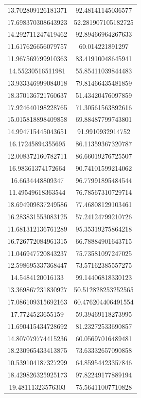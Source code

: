 \begin{table}
\begin{tabular}{cc}
13.702809126181371 & 92.48141145036577 \\
17.698370308643923 & 52.281907105182725 \\
14.292711247419462 & 92.89466964267633 \\
11.617626656079757 & 60.014221891297 \\
11.967569799910363 & 83.41910048645941 \\
14.55230516511981 & 55.85411039844483 \\
13.933346999084018 & 79.81466435481859 \\
18.370136721760637 & 51.43420476097859 \\
17.924640198228765 & 71.30561563892616 \\
15.015818898409858 & 69.88487799743801 \\
14.994715445043651 & 91.9910932914752 \\
16.17245894355695 & 86.11359367320787 \\
12.008372160782711 & 86.66019276725507 \\
16.98361374172664 & 90.74101599214062 \\
16.6634448809347 & 96.77991895484544 \\
11.49549618363544 & 76.78567310729714 \\
18.694909837249586 & 77.46808129103461 \\
16.283831553083125 & 57.24124799210726 \\
11.681312136761289 & 95.35319275864218 \\
16.726772084961315 & 66.78884901643715 \\
11.046947720843237 & 75.73581097247025 \\
12.598695337368447 & 73.57162385557275 \\
14.5484120016133 & 99.14406818330123 \\
13.369867231830927 & 50.512828253252565 \\
17.086109315692163 & 60.476204406491554 \\
17.7724523655159 & 59.39469118273995 \\
11.690415434728692 & 81.23272533690857 \\
14.807079774415236 & 60.05697016489481 \\
18.230965433413875 & 73.63332657090858 \\
10.539104187327299 & 64.85954423357846 \\
18.429826325925173 & 97.82249177889194 \\
19.48111323576303 & 75.56411007710828 \\

\end{tabular}
\end{table}
